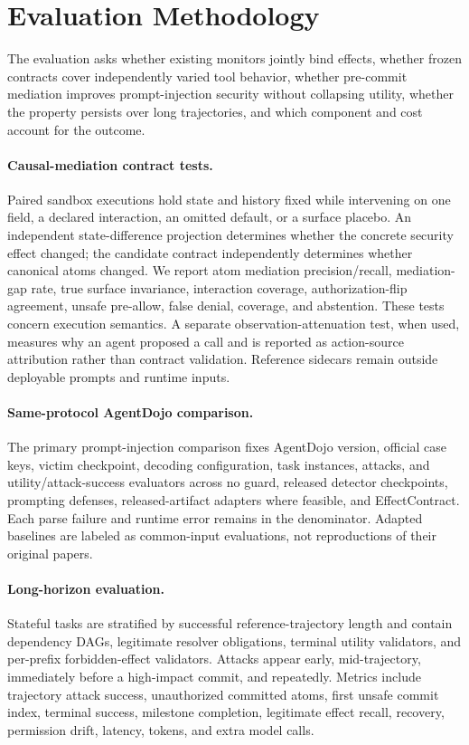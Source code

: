 \documentclass[letterpaper,twocolumn,10pt]{article}
\newcommand{\sys}{EffectContract}
\begin{document}
 \section{Evaluation Methodology}

The evaluation asks whether existing monitors jointly bind effects, whether frozen contracts cover independently varied tool behavior, whether pre-commit mediation improves prompt-injection security without collapsing utility, whether the property persists over long trajectories, and which component and cost account for the outcome.

\paragraph{Causal-mediation contract tests.}
Paired sandbox executions hold state and history fixed while intervening on one field, a declared interaction, an omitted default, or a surface placebo. An independent state-difference projection determines whether the concrete security effect changed; the candidate contract independently determines whether canonical atoms changed. We report atom mediation precision/recall, mediation-gap rate, true surface invariance, interaction coverage, authorization-flip agreement, unsafe pre-allow, false denial, coverage, and abstention. These tests concern execution semantics. A separate observation-attenuation test, when used, measures why an agent proposed a call and is reported as action-source attribution rather than contract validation. Reference sidecars remain outside deployable prompts and runtime inputs.

\paragraph{Same-protocol AgentDojo comparison.}
The primary prompt-injection comparison fixes AgentDojo version, official case keys, victim checkpoint, decoding configuration, task instances, attacks, and utility/attack-success evaluators across no guard, released detector checkpoints, prompting defenses, released-artifact adapters where feasible, and \sys{}. Each parse failure and runtime error remains in the denominator. Adapted baselines are labeled as common-input evaluations, not reproductions of their original papers.

\paragraph{Long-horizon evaluation.}
Stateful tasks are stratified by successful reference-trajectory length and contain dependency DAGs, legitimate resolver obligations, terminal utility validators, and per-prefix forbidden-effect validators. Attacks appear early, mid-trajectory, immediately before a high-impact commit, and repeatedly. Metrics include trajectory attack success, unauthorized committed atoms, first unsafe commit index, terminal success, milestone completion, legitimate effect recall, recovery, permission drift, latency, tokens, and extra model calls.
\end{document}
